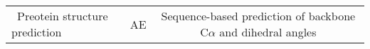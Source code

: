 \begin{center}
\begin{tabular}{|l|c|c|}
    \
    Preotein structure prediction & AE & Sequence-based prediction of backbone C$\alpha$ and dihedral angles 
\end{tabular}
\end{center}